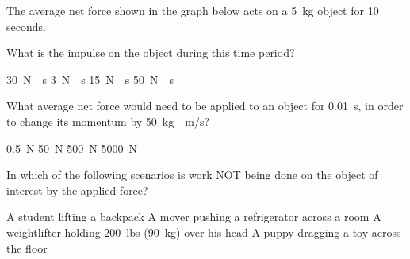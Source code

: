 \documentclass[answers]{exam}
\begin{document}
\begin{questions}
\clearpage
\question
The average net force shown in the graph below acts on a \SI{5}{kg} object for 10 seconds.

\begin{center}
\end{center}

What is the impulse on the object during this time period?

\begin{randomizechoices}[norandomize]
    \correctchoice \SI{30}{N\cdot s}
    \choice \SI{3}{N\cdot s}
    \choice \SI{15}{N\cdot s}
    \choice \SI{50}{N\cdot s}
\end{randomizechoices}



\question
What average net force would need to be applied to an object for \SI{0.01}{s}, in order to change its momentum by \SI{50}{kg\cdot m/s}?

\begin{randomizechoices}[norandomize]
    \choice \SI{0.5}{N}
    \choice \SI{50}{N}
    \choice \SI{500}{N}
    \correctchoice \SI{5000}{N}
\end{randomizechoices}

\question
In which of the following scenarios is work NOT being done on the object of interest by the applied force?

\begin{randomizechoices}[norandomize]
    \choice A student lifting a backpack
    \choice A mover pushing a refrigerator across a room
    \correctchoice A weightlifter holding \SI{200}{lbs} (\SI{90}{kg}) over his head
    \choice A puppy dragging a toy across the floor
\end{randomizechoices}


\end{questions}
\end{document}
